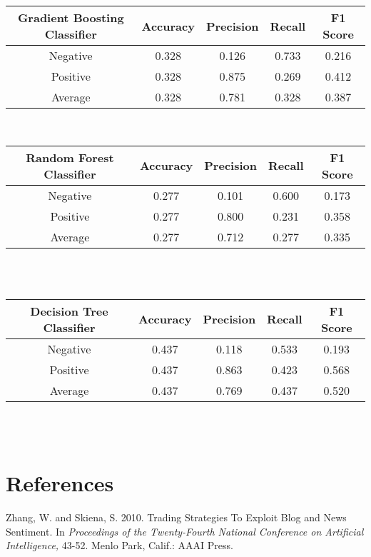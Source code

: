\documentclass[letterpaper]{article}
\begin{document}
\begin{tabular}{c | c c c c}
\textbf{Gradient Boosting Classifier}   & Accuracy  & Precision & Recall    & F1 Score  \\
\hline
Negative        & 0.328     & 0.126     & 0.733     & 0.216     \\
Positive        & 0.328     & 0.875     & 0.269     & 0.412     \\
Average         & 0.328     & 0.781     & 0.328     & 0.387     \\
\end{tabular} \\



\begin{tabular}{c | c c c c}
\textbf{Random Forest Classifier}   & Accuracy  & Precision & Recall    & F1 Score  \\
\hline
Negative        & 0.277     & 0.101     & 0.600     & 0.173     \\
Positive        & 0.277     & 0.800     & 0.231     & 0.358     \\
Average         & 0.277     & 0.712     & 0.277     & 0.335     \\
\end{tabular} \\ \\



\begin{tabular}{c | c c c c}
\textbf{Decision Tree Classifier}   & Accuracy  & Precision & Recall    & F1 Score  \\
\hline
Negative        & 0.437     & 0.118     & 0.533     & 0.193     \\
Positive        & 0.437     & 0.863     & 0.423     & 0.568     \\
Average         & 0.437     & 0.769     & 0.437     & 0.520     \\
\end{tabular} \\ \\

\section{References}

\smallskip \noindent Zhang, W. and Skiena, S. 2010. Trading Strategies To Exploit Blog and News Sentiment. In \textit{Proceedings of the Twenty-Fourth National Conference on Artificial Intelligence,} 43-52. Menlo Park, Calif.: AAAI Press. 
\end{document}
